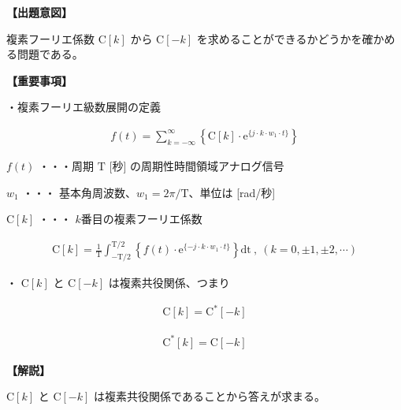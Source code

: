 \noindent \textbf{【出題意図】}

\bigskip
\noindent 複素フーリエ係数 $\textrm{C}[k]$ から $\textrm{C}[-k]$ を求めることができるかどうかを確かめる問題である。

\vspace{1em}
\noindent \textbf{【重要事項】}

\medskip
\noindent ・複素フーリエ級数展開の定義

\begin{align*}
f(t) = \sum_{k = -\infty}^{\infty} 
\left \{
\textrm{C}[k] \cdot \textrm{e}^{\{j \cdot k \cdot w_1 \cdot t \}}
\right \}
\end{align*}

\medskip
\noindent $f(t)$ ・・・周期 $\textrm{T}$ [秒] の周期性時間領域アナログ信号

\medskip
\noindent $w_1$ ・・・ 基本角周波数、$w_1 = 2\pi/\textrm{T}$、単位は [rad/秒]

\medskip
\noindent $\textrm{C}[k]$ ・・・ $k$番目の複素フーリエ係数

\begin{align*}
\textrm{C}[k] = \frac{1}{\textrm{T}} \int_{-\textrm{T}/2}^{\textrm{T}/2} 
\left \{
f(t) \cdot \textrm{e}^{\{-j \cdot k \cdot w_1 \cdot t \}} 
\right \}
\textrm{dt}
\ ,\  (k = 0, \pm 1, \pm 2, \cdots)
\end{align*}

\bigskip
\noindent ・ $\textrm{C}[k]$ と $\textrm{C}[-k]$ は複素共役関係、つまり

\begin{align*}
\textrm{C}[k] = \textrm{C}^{*}[-k]
\end{align*}

\begin{align*}
\textrm{C}^{*}[k] = \textrm{C}[-k]
\end{align*}

\bigskip

\vspace{1em}
\noindent \textbf{【解説】}

\bigskip
\noindent $\textrm{C}[k]$ と $\textrm{C}[-k]$ は複素共役関係であることから答えが求まる。
